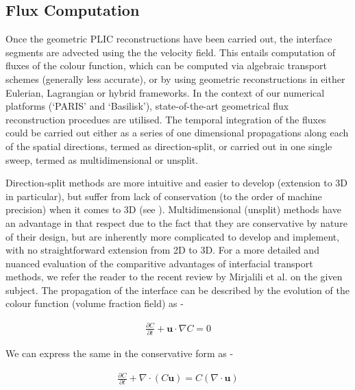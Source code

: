 \subsection*{Flux Computation}
Once the geometric PLIC reconstructions have been carried out, 
the interface segments are advected using the the velocity field. 
This entails computation of fluxes of the colour function, which 
can be computed via algebraic transport schemes (generally less accurate), 
or by using geometric reconstructions in either Eulerian, Lagrangian or hybrid frameworks.
In the context of our numerical platforms (`PARIS' and `Basilisk'), 
state-of-the-art   
geometrical flux reconstruction procedues are utilised. 
The temporal integration of the fluxes could be carried out either as a 
series of one dimensional propagations along each of the spatial directions, 
termed as direction-split, or carried out in one single sweep, 
termed as multidimensional or unsplit.

Direction-split methods are more intuitive and easier to develop (extension to 
3D in particular), but suffer from lack of conservation (to the order of 
machine precision) when it comes to 3D (see \cite{weymouth2010conservative}). 
Multidimensional (unsplit) methods have an advantage in that respect due to the 
fact that they are conservative by nature of their design, but are inherently 
more complicated to develop and implement, with no straightforward extension from 2D to 3D.    
For a more detailed and nuanced evaluation of the comparitive advantages of 
interfacial transport methods, we refer the reader to the recent review by 
Mirjalili et al. \cite{mirjalili2017interface} on the given subject.     
The propagation of the interface can be described by the evolution of
the colour function (volume fraction field) as - 

\begin{align} 
	\frac{\partial C}{\partial t} + \boldsymbol{u} \cdot \nabla C = 0  	
\label{cvof_non}
\end{align}

We can express the same in the conservative form as - 

\begin{align} 
	\frac{\partial C}{\partial t} + \nabla \cdot \left(C \boldsymbol{u}\right) = C \left(\nabla \cdot \boldsymbol{u}\right) 	
\label{cvof_con}
\end{align}



